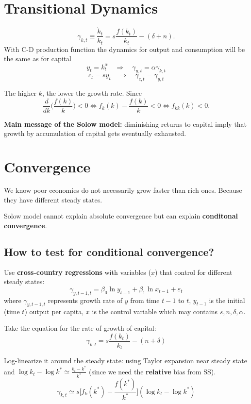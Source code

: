 \section{Transitional Dynamics}
\[
    \gamma_{k,t} \equiv \frac{\dot{k}_t}{k_t} = s \frac{f(k_t)}{k_t} - (\delta + n).
\]
With C-D production function the dynamics for output and consumption will be the same as for capital \[
    y_t = k_t^\alpha \quad\Longrightarrow \quad\gamma_{y,t} = \alpha\gamma_{k,t}
\]\[
    c_t = sy_t \quad \Longrightarrow \quad\gamma_{c,t} = \gamma_{y,t}
\]

The higher $k$, the lower the growth rate. Since \[
    \frac{d}{dk}\Big(\frac{f(k)}{k}\Big) < 0 \iff f_k(k) - \frac{f(k)}{k} < 0 \iff f_{kk}(k)<0.
\]

\textbf{Main message of the Solow model:} diminishing returns to capital imply that growth by accumulation of capital gets eventually exhausted.


\section{Convergence}

We know poor economies do not necessarily grow faster than rich ones. Because they have different steady states.

Solow model cannot explain absolute convergence but can explain \textbf{conditonal convergence}.

\subsection{How to test for conditional convergence?}

Use \textbf{cross-country regressions} with variables ($x$) that control for different steady states: \[
    \gamma_{y,t-1,t} = \beta_0\ln y_{t-1} + \beta_1\ln x_{t-1} + \varepsilon_t
\] where $\gamma_{y,t-1,t}$ represents growth rate of $y$ from time $t-1$ to $t$, $y_{t-1}$ is the initial (time $t$) output per capita, $x$ is the control variable which may contains $s, n, \delta, \alpha$.

Take the equation for the rate of growth of capital: \[
    \gamma_{k,t} = s \frac{f(k_t)}{k_t} - (n + \delta)
\]

Log-linearize it around the steady state: using Taylor expansion near steady state and $\log k_t - \log k^* \simeq \frac{k_t - k^*}{k^*}$ (since we need the \textbf{relative} bias from SS). \[
    \gamma_{k,t} \simeq s\Big[f_k(k^*) - \frac{f(k^*)}{k^*}\Big](\log k_t - \log k^*)
\]

